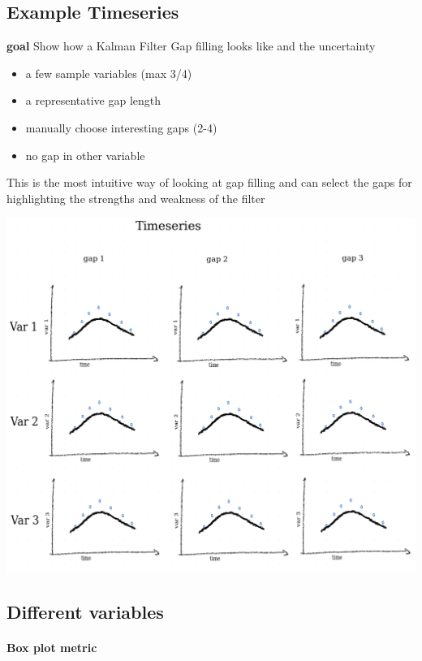 \documentclass{article}
\let\Oldsubsection\subsection
\renewcommand{\subsection}{\FloatBarrier\Oldsubsection}
\begin{document}
\subsection{Example Timeseries}

\textbf{goal} Show how a Kalman Filter Gap filling looks like and the uncertainty 

\begin{itemize}
    \item a few sample variables (max 3/4)
    \item a representative gap length
    \item manually choose interesting gaps (2-4)
    \item no gap in other variable
\end{itemize}

This is the most intuitive way of looking at gap filling and can select the gaps for highlighting the strengths and weakness of the filter

\includegraphics[width=\textwidth]{example_plot_timeseries}


\subsection{Different variables}

\paragraph{Box plot metric}
\end{document}
